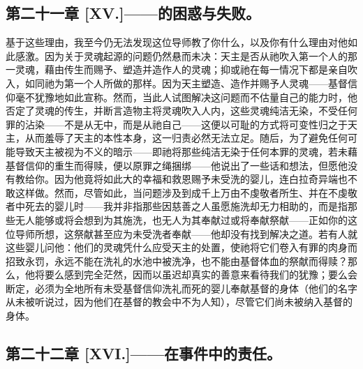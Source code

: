 
\subsection{第二十一章 [XV.]——的困惑与失败。}

基于这些理由，我至今仍无法发现这位导师教了你什么，以及你有什么理由对他如此感激。因为关于灵魂起源的问题仍然悬而未决：天主是否从祂吹入第一个人的那一灵魂，藉由传生而赐予、塑造并造作人的灵魂；抑或祂在每一情况下都是亲自吹入，如同祂为第一个人所做的那样。因为天主塑造、造作并赐予人灵魂——基督信仰毫不犹豫地如此宣称。然而，当此人试图解决这问题而不估量自己的能力时，他否定了灵魂的传生，并断言造物主将灵魂吹入人内，这些灵魂纯洁无染，不受任何罪的沾染——不是从无中，而是从祂自己——这便以可耻的方式将可变性归之于天主，从而羞辱了天主的本性本身，这一归责必然无法立足。随后，为了避免任何可能导致天主被视为不义的暗示——即祂将那些纯洁无染于任何本罪的灵魂，若未藉基督信仰的重生而得赎，便以原罪之绳捆绑——他说出了一些话和想法，但愿他没有教给你。因为他竟将如此大的幸福和救恩赐予未受洗的婴儿，连白拉奇异端也不敢这样做。然而，尽管如此，当问题涉及到成千上万由不虔敬者所生、并在不虔敬者中死去的婴儿时——我并非指那些因慈善之人虽愿施洗却无力相助的，而是指那些无人能够或将会想到为其施洗，也无人为其奉献过或将奉献祭献——正如你的这位导师所想，这祭献甚至应为未受洗者奉献——他却没有找到解决之道。若有人就这些婴儿问他：他们的灵魂凭什么应受天主的处置，使祂将它们卷入有罪的肉身而招致永罚，永远不能在洗礼的水池中被洗净，也不能由基督体血的祭献而得赎？那么，他将要么感到完全茫然，因而以虽迟却真实的善意来看待我们的犹豫；要么会断定，必须为全地所有未受基督信仰洗礼而死的婴儿奉献基督的身体（他们的名字从未被听说过，因为他们在基督的教会中不为人知），尽管它们尚未被纳入基督的身体。\par


\subsection{第二十二章 [XVI.]——在事件中的责任。}

